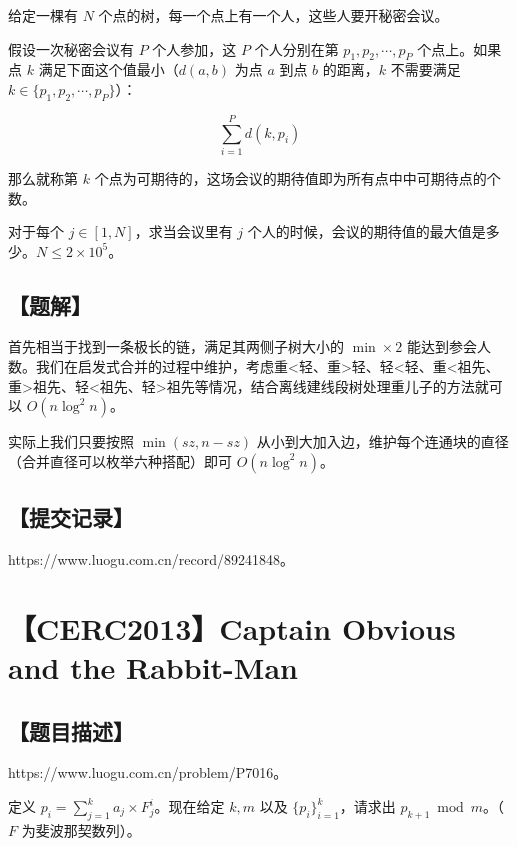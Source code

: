 \documentclass[UTF8,12pt,a4paper]{ctexart}
\begin{document}
	给定一棵有 $N$ 个点的树，每一个点上有一个人，这些人要开秘密会议。
	
	假设一次秘密会议有 $P$ 个人参加，这 $P$ 个人分别在第 $p_1,p_2,\cdots,p_P$ 个点上。如果点 $k$ 满足下面这个值最小（$d(a,b)$ 为点 $a$ 到点 $b$ 的距离，$k$ 不需要满足 $k \in \{p_1,p_2,\cdots,p_P\}$）：
	
	$$\sum\limits_{i=1}^Pd(k,p_i)$$
	
	那么就称第 $k$ 个点为可期待的，这场会议的期待值即为所有点中中可期待点的个数。
	
	对于每个 $j \in [1,N]$，求当会议里有 $j$ 个人的时候，会议的期待值的最大值是多少。$N\le 2\times 10^5$。
	
	\subsection*{【题解】}
	
	首先相当于找到一条极长的链，满足其两侧子树大小的 $\min\times 2$ 能达到参会人数。我们在启发式合并的过程中维护，考虑重<轻、重>轻、轻<轻、重<祖先、重>祖先、轻<祖先、轻>祖先等情况，结合离线建线段树处理重儿子的方法就可以 $O(n\log^2n)$。
	
	实际上我们只要按照 $\min(sz,n-sz)$ 从小到大加入边，维护每个连通块的直径（合并直径可以枚举六种搭配）即可 $O(n\log^2n)$。
	
	\subsection*{【提交记录】}
	
	https://www.luogu.com.cn/record/89241848。
	
	
	\section*{【CERC2013】Captain Obvious and the Rabbit-Man}
	
	\subsection*{【题目描述】}
	
	https://www.luogu.com.cn/problem/P7016。
	
	定义 $p_i=\sum\limits_{j=1}^ka_j\times F_j^i$。现在给定 $k,m$ 以及 $\{p_i\}_{i=1}^k$，请求出 $p_{k+1}\bmod m$。（$F$ 为斐波那契数列）。
	
\end{document}
